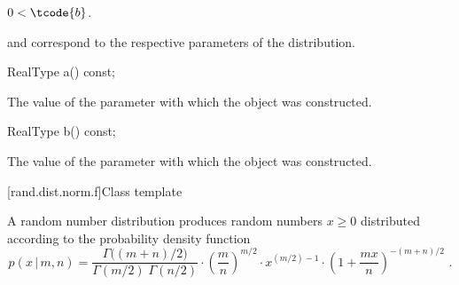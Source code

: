 \begin{itemdescr}
\pnum
\expects
$0 < \tcode{b}$.

\pnum
\remarks
{} and 
correspond to the respective parameters of the distribution.
\end{itemdescr}

%
\begin{itemdecl}
RealType a() const;
\end{itemdecl}

\begin{itemdescr}
\pnum
\returns
The value of the  parameter
 with which the object was constructed.
\end{itemdescr}

%
\begin{itemdecl}
RealType b() const;
\end{itemdecl}

\begin{itemdescr}
\pnum
\returns
The value of the  parameter
 with which the object was constructed.
\end{itemdescr}


[rand.dist.norm.f]{Class template }%
%

\pnum
A  random number distribution
produces random numbers $x \ge 0$
distributed according to
the probability density function%
\[ p(x\,|\,m,n) = \frac{\Gamma\big((m+n)/2\big)}{\Gamma(m/2) \; \Gamma(n/2)}
     \cdot \left(\frac{m}{n}\right)^{m/2}
     \cdot x^{(m/2)-1}
     \cdot \left(1 + \frac{m x}{n}\right)^{-(m + n)/2}
     \text{ .} \]

